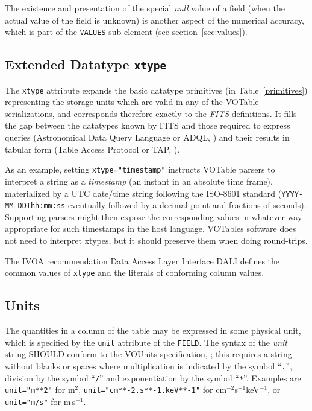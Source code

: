 \documentclass[11pt,a4paper]{ivoa}
\def\Aref#1{section~\ref{#1}}
\def\Tref#1{Table~\ref{#1}}
\let\fg=\color
\def\attr#1{{\tt{\fg{DarkRed}#1}}}
\def\elem#1{{\tt{\fg{DarkRed}#1}}}
\def\attrval#1#2{{\tt{\fg{DarkRed}#1}="{\fg{DarkPurple}#2}"}}
\begin{document}
The existence and presentation of the special {\em null} value of
a field (when the actual value of the field is unknown) is
another aspect of the numerical accuracy, which is part of the
\elem{VALUES} sub-element (see \Aref{sec:values}).

\subsection{Extended Datatype \attr{xtype}}
\label{sec:xtype}

The \attr{xtype} attribute expands the basic
datatype primitives (in \Tref{primitives})
representing the storage units which are valid in any of the
VOTable serializations,
and corresponds therefore exactly to the {\em FITS} definitions.
It fills the gap between the datatypes
known by FITS and those required to express queries
(Astronomical Data Query Language or ADQL, \citet{2023ivoa.spec.1215M})
and their results in tabular form (Table Access Protocol or TAP,
\citet{2010ivoa.spec.0327D}).

As an example, setting \attrval{xtype}{timestamp} instructs VOTable
parsers to interpret a string as a {\em  timestamp}
(an instant in an absolute time frame), materialized by a
UTC date/time string following the ISO-8601 standard
({\tt YYYY-MM-DDThh:mm:ss} eventually followed by a decimal point
and fractions of seconds).  Supporting parsers might then expose the
corresponding values in whatever way appropriate for such timestamps in
the host language.  VOTables software does not need to interpret xtypes,
but it should preserve them when doing round-trips.

The IVOA recommendation Data Access Layer Interface DALI
\citep{2017ivoa.spec.0517D} defines the common values of \attr{xtype}
and the literals of conforming column values.

\subsection{Units}
\label{sec:unit}

The quantities in a column of the table may be expressed in
some physical unit,
which is specified by the {\attr{unit}}
attribute of the {\elem{FIELD}}.
The syntax of the {\em unit} string SHOULD conform to
the VOUnits specification, \citet{2023ivoa.spec.1215G};
this requires a string without blanks or spaces
where multiplication is indicated by the symbol ``{\tt.}'',
division by the symbol ``{\tt/}''
and exponentiation by the symbol ``{\tt**}''.
Examples are \attrval{unit}{m**2} for m$^2$,
\attrval{unit}{cm**-2.s**-1.keV**-1} for cm$^{-2}$s$^{-1}$keV$^{-1}$,
or \attrval{unit}{m/s} for m\,s$^{-1}$.
\end{document}
